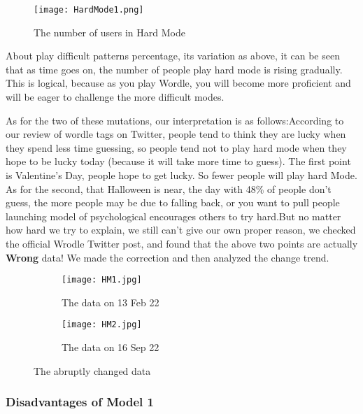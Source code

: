 \documentclass[12pt]{article}  %
\begin{document}
\begin{figure}[htbp]
	\centering
	\texttt{[image: HardMode1.png]}
	\caption{The number of users in Hard Mode}\label{fig:result}
\end{figure}


About play difficult patterns percentage, its variation as above, it can be seen that as time goes on, the number of people play hard mode is rising gradually. This is logical, because as you play Wordle, you will become more proficient and will be eager to challenge the more difficult modes.


As for the two of these mutations, our interpretation is as follows:According to our review of wordle tags on Twitter, people tend to think they are lucky when they spend less time guessing, so people tend not to play hard mode when they hope to be lucky today (because it will take more time to guess). The first point is Valentine's Day, people hope to get lucky. So fewer people will play hard Mode.
As for the second, that Halloween is near, the day with 48\% of people don't guess, the more people may be due to falling back, or you want to pull people launching model of psychological encourages others to try hard.But no matter how hard we try to explain, we still can't give our own proper reason, we checked the official Wrodle Twitter post, and found that the above two points are actually \textbf{Wrong} data! We made the correction and then analyzed the change trend.

\clearpage



\begin{figure}[htbp]
	
	\begin{subfigure}[b]{.5\textwidth}
		\texttt{[image: HM1.jpg]}
		\caption{The data on 13 Feb 22}\label{subfig:left}
	\end{subfigure}
	\begin{subfigure}[b]{.455\textwidth}
		\texttt{[image: HM2.jpg]}
		\caption{The data on 16 Sep 22}\label{subfig:right}
	\end{subfigure}
	\caption{The abruptly changed data \cite{2}}\label{fig:subfigures}
\end{figure}



\subsubsection{Disadvantages of Model 1}
\end{document}
